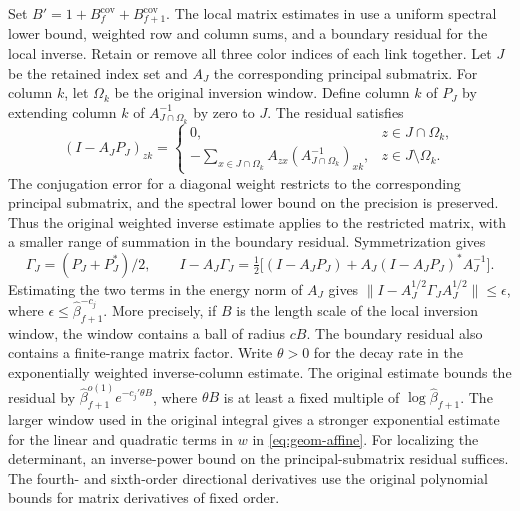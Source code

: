 \documentclass[11pt,a4paper]{article}
\numberwithin{equation}{section}
\begin{document}
Set \(B'=1+B_f^{\mathrm{cov}}+B_{f+1}^{\mathrm{cov}}\). The local matrix estimates in \cite[Lemmas 11.13--11.14]{armstrong} use a uniform spectral lower bound, weighted row and column sums, and a boundary residual for the local inverse. Retain or remove all three color indices of each link together. Let \(J\) be the retained index set and \(A_J\) the corresponding principal submatrix. For column \(k\), let \(\Omega_k\) be the original inversion window. Define column \(k\) of \(P_J\) by extending column \(k\) of \(A_{J\cap\Omega_k}^{-1}\) by zero to \(J\). The residual satisfies
\[
 (I-A_JP_J)_{zk}=
 \begin{cases}
 0,&z\in J\cap\Omega_k,\\
 -\displaystyle\sum_{x\in J\cap\Omega_k}
                      A_{zx}(A_{J\cap\Omega_k}^{-1})_{xk},
     &z\in J\setminus\Omega_k .
 \end{cases}
\]
The conjugation error for a diagonal weight restricts to the corresponding principal submatrix, and the spectral lower bound on the precision is preserved. Thus the original weighted inverse estimate applies to the restricted matrix, with a smaller range of summation in the boundary residual. Symmetrization gives
\[
 \Gamma_J=(P_J+P_J^*)/2,\qquad
 I-A_J\Gamma_J=
 \tfrac12\big[(I-A_JP_J)+A_J(I-A_JP_J)^*A_J^{-1}\big].
\]
Estimating the two terms in the energy norm of \(A_J\) gives
\(\|I-A_J^{1/2}\Gamma_J A_J^{1/2}\|\le\epsilon\),
where \(\epsilon\le\widehat\beta_{f+1}^{-c_j}\). More precisely, if \(B\) is the length scale of the local inversion window, the window contains a ball of radius \(cB\). The boundary residual also contains a finite-range matrix factor. Write \(\theta>0\) for the decay rate in the exponentially weighted inverse-column estimate. The original estimate bounds the residual by \(\widehat\beta_{f+1}^{o(1)}e^{-c_j'\theta B}\), where \(\theta B\) is at least a fixed multiple of \(\log\widehat\beta_{f+1}\). The larger window used in the original integral gives a stronger exponential estimate for the linear and quadratic terms in \(w\) in \eqref{eq:geom-affine}. For localizing the determinant, an inverse-power bound on the principal-submatrix residual suffices. The fourth- and sixth-order directional derivatives use the original polynomial bounds for matrix derivatives of fixed order.
\end{document}
